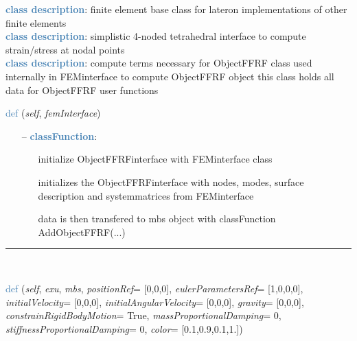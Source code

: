 \begin{itemize}[leftmargin=1.4cm]
\begin{itemize}[leftmargin=1.4cm]
\begin{itemize}[leftmargin=0.5cm]
\begin{itemize}[leftmargin=1.4cm]
\begin{itemize}[leftmargin=1.4cm]
\begin{itemize}[leftmargin=0.5cm]
%
\noindent\textcolor{steelblue}{{\bf class description}}:  finite element base class for lateron implementations of other finite elements
\vspace{3pt} \\ 
\noindent\textcolor{steelblue}{{\bf class description}}:  simplistic 4-noded tetrahedral interface to compute strain/stress at nodal points
\vspace{3pt} \\ 
\noindent\textcolor{steelblue}{{\bf class description}}:  compute terms necessary for ObjectFFRF
class used internally in FEMinterface to compute ObjectFFRF object
this class holds all data for ObjectFFRF user functions
\vspace{3pt} \\ 
\begin{flushleft}
\noindent \textcolor{steelblue}{def {\bf {}}}\label{sec:FEM:ObjectFFRFinterface:__init__}
({\it self}, {\it femInterface})
\end{flushleft}
\setlength{\itemindent}{0.7cm}
\begin{itemize}[leftmargin=0.7cm]
\item[--]\textcolor{steelblue}{\bf classFunction}: \vspace{-6pt}
\begin{itemize}[leftmargin=1.2cm]
\setlength{\itemindent}{-0.7cm}
\item[]initialize ObjectFFRFinterface with FEMinterface class
\item[]initializes the ObjectFFRFinterface with nodes, modes, surface description and systemmatrices from FEMinterface
\item[]data is then transfered to mbs object with classFunction AddObjectFFRF(...)
\end{itemize}
\vspace{12pt}\end{itemize}
%
\noindent\rule{8cm}{0.75pt}\vspace{1pt} \\ 
\begin{flushleft}
\noindent \textcolor{steelblue}{def {\bf {}}}\label{sec:FEM:ObjectFFRFinterface:AddObjectFFRF}
({\it self}, {\it exu}, {\it mbs}, {\it positionRef}= [0,0,0], {\it eulerParametersRef}= [1,0,0,0], {\it initialVelocity}= [0,0,0], {\it initialAngularVelocity}= [0,0,0], {\it gravity}= [0,0,0], {\it constrainRigidBodyMotion}= True, {\it massProportionalDamping}= 0, {\it stiffnessProportionalDamping}= 0, {\it color}= [0.1,0.9,0.1,1.])

\end{flushleft}
\end{itemize}
\end{itemize}
\end{itemize}
\end{itemize}
\end{itemize}
\end{itemize}
